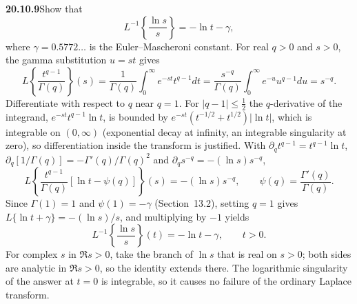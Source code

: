 \par\bigskip
\noindent\textbf{20.10.9}\quad Show that
\[
L^{-1}\left\{\frac{\ln s}{s}\right\}=-\ln t-\gamma,
\]
where $\gamma=0.5772\ldots$ is the Euler--Mascheroni constant.
\solution
For real $q>0$ and $s>0$, the gamma substitution $u=st$ gives
\[
L\left\{\frac{t^{q-1}}{\Gamma(q)}\right\}(s)
=\frac1{\Gamma(q)}\int_0^\infty e^{-st}t^{q-1}dt
=\frac{s^{-q}}{\Gamma(q)}\int_0^\infty e^{-u}u^{q-1}du=s^{-q}.
\]
Differentiate with respect to $q$ near $q=1$. For
$|q-1|\le\frac12$ the $q$-derivative of the integrand,
$e^{-st}t^{q-1}\ln t$, is bounded by
$e^{-st}(t^{-1/2}+t^{1/2})|\ln t|$, which is integrable on
$(0,\infty)$ (exponential decay at infinity, an integrable
singularity at zero), so differentiation inside the transform
is justified. With
$\partial_qt^{q-1}=t^{q-1}\ln t$,
$\partial_q[1/\Gamma(q)]=-\Gamma'(q)/\Gamma(q)^2$ and
$\partial_qs^{-q}=-(\ln s)s^{-q}$,
\[
L\left\{\frac{t^{q-1}}{\Gamma(q)}
[\ln t-\psi(q)]\right\}(s)=-(\ln s)s^{-q},
\qquad\psi(q)=\frac{\Gamma'(q)}{\Gamma(q)}.
\]
Since $\Gamma(1)=1$ and $\psi(1)=-\gamma$ (Section~13.2),
setting $q=1$ gives $L\{\ln t+\gamma\}=-(\ln s)/s$, and
multiplying by $-1$ yields
\[
\boxed{L^{-1}\left\{\frac{\ln s}{s}\right\}(t)
=-\ln t-\gamma},\qquad t>0.
\]
For complex $s$ in $\Re s>0$, take the branch of $\ln s$
that is real on $s>0$; both sides are analytic in $\Re s>0$,
so the identity extends there. The logarithmic singularity of the
answer at $t=0$ is integrable, so it causes no failure of the
ordinary Laplace transform.

